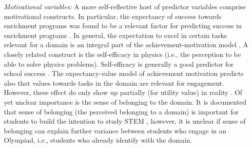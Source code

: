 \documentclass[D:/studies/WinnerS/Erhebungen/IPhO1718/paper/problem_solving/main/TaylorFrancis/interactapasample]{subfiles}
\begin{document}

\textit{Motivational variables:} A more self-reflective host of predictor variables comprise motivational constructs. In particular, the expectancy of success towards enrichment programs was found to be a relevant factor for predicting success in enrichment programs \citep{Urhahne.2012}. In general, the expectation to excel in certain tasks relevant for a domain is an integral part of the achievement-motivation model \citep{Eccles.1983}. A closely related construct is the self-efficacy in physics (i.e., the perception to be able to solve physics problems). Self-efficacy is generally a good predictor for school success \citep[e.g.,][]{Britner.2006}. The expectancy-value model of achievement motivation predicts also that values towards tasks in the domain are relevant for engagement. However, these effect do only show up partially (for utility value) in reality \citep{Urhahne.2012}. Of yet unclear importance is the sense of belonging to the domain. It is documented that sense of belonging (the perceived belonging to a domain) is important for students to build the intention to study STEM \citep{Good.2012}, however, it is unclear if sense of belonging can explain further variance between students who engage in an Olympiad, i.e., students who already identify with the domain.

\end{document}
